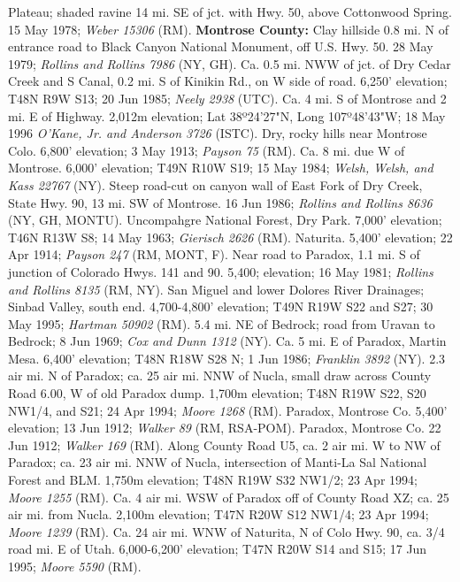 Plateau; shaded ravine 14 mi. SE of jct. with Hwy. 50, above Cottonwood Spring.
15 May 1978; \textit{Weber 15306} (RM).
  \textbf{Montrose County:}
Clay hillside 0.8 mi. N of entrance road to Black Canyon National Monument,
off U.S. Hwy. 50. 28 May 1979; \textit{Rollins and Rollins 7986} (NY, GH).
Ca. 0.5 mi. NWW of jct. of Dry Cedar Creek and S Canal, 0.2 mi. S of Kinikin Rd.,
on W side of road. 6,250' elevation; T48N R9W S13; 20 Jun 1985;
\textit{Neely 2938} (UTC).
Ca. 4 mi. S of Montrose and 2 mi. E of Highway. 2,012m elevation; Lat 38º24'27"N,
Long 107º48'43"W; 18 May 1996 \textit{O'Kane, Jr. and Anderson 3726} (ISTC).
Dry, rocky hills near Montrose Colo. 6,800' elevation; 3 May 1913;
\textit{Payson 75} (RM).
Ca. 8 mi. due W of Montrose. 6,000' elevation; T49N R10W S19; 15 May 1984;
\textit{Welsh, Welsh, and Kass 22767} (NY).
Steep road-cut on canyon wall of East Fork of Dry Creek, State Hwy. 90, 13 mi.
SW of Montrose. 16 Jun 1986; \textit{Rollins and Rollins 8636} (NY, GH, MONTU).
Uncompahgre National Forest, Dry Park. 7,000' elevation; T46N R13W S8;
14 May 1963; \textit{Gierisch 2626} (RM).
Naturita. 5,400' elevation; 22 Apr 1914; \textit{Payson 247} (RM, MONT, F).
Near road to Paradox, 1.1 mi. S of junction of Colorado Hwys. 141 and 90.
5,400; elevation; 16 May 1981; \textit{Rollins and Rollins 8135} (RM, NY).
San Miguel and lower Dolores River Drainages; Sinbad Valley, south end.
4,700-4,800' elevation; T49N R19W S22 and S27; 30 May 1995;
\textit{Hartman 50902} (RM).
5.4 mi. NE of Bedrock; road from Uravan to Bedrock; 8 Jun 1969;
\textit{Cox and Dunn 1312} (NY).
Ca. 5 mi. E of Paradox, Martin Mesa. 6,400' elevation; T48N R18W S28 N;
1 Jun 1986; \textit{Franklin 3892} (NY).
2.3 air mi. N of Paradox; ca. 25 air mi. NNW of Nucla, small draw across County
Road 6.00, W of old Paradox dump. 1,700m elevation; T48N R19W S22, S20 NW1/4,
and S21; 24 Apr 1994; \textit{Moore 1268} (RM).
Paradox, Montrose Co. 5,400' elevation; 13 Jun 1912;
\textit{Walker 89} (RM, RSA-POM).
Paradox, Montrose Co. 22 Jun 1912; \textit{Walker 169} (RM).
Along County Road U5, ca. 2 air mi. W to NW of Paradox; ca. 23 air mi. NNW of
Nucla, intersection of Manti-La Sal National Forest and BLM. 1,750m elevation;
T48N R19W S32 NW1/2; 23 Apr 1994; \textit{Moore 1255} (RM).
Ca. 4 air mi. WSW of Paradox off of County Road XZ; ca. 25 air mi. from Nucla.
2,100m elevation; T47N R20W S12 NW1/4; 23 Apr 1994; \textit{Moore 1239} (RM).
Ca. 24 air mi. WNW of Naturita, N of Colo Hwy. 90, ca. 3/4 road mi. E of Utah.
6,000-6,200' elevation; T47N R20W S14 and S15; 17 Jun 1995;
\textit{Moore 5590} (RM).
